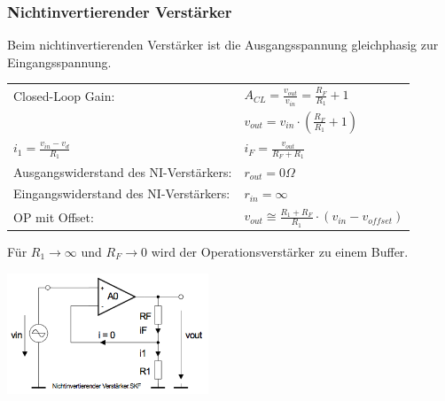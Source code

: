 	\subsubsection{Nichtinvertierender Verstärker}
			Beim nichtinvertierenden Verstärker ist die Ausgangsspannung
      gleichphasig zur Eingangsspannung.\\ 
			\begin{minipage}[T]{12cm}
      	
        \begin{tabular}{ll}
        	Closed-Loop Gain: &
        	$A_{CL}=\frac{v_{out}}{v_{in}}=\frac{R_F}{R_1}+1$\\
        	& $v_{out} = v_{in}\cdot(\frac{R_F}{R_1}+1)$ \\
        	$i_1=\frac{v_{in}-v_d}{R_1}$ &
        	$i_F=\frac{v_{out}}{R_F+R_1}$\\
          Ausgangswiderstand des NI-Verstärkers: &
          $r_{out}=0\Omega$\\
          Eingangswiderstand des NI-Verstärkers: &
          $r_{in}=\infty$\\
          OP mit Offset: &
          $v_{out} \cong \frac{R_1+R_F}{R_1} \cdot (v_{in}-v_{offset})$\\
        \end{tabular}
        Für $R_1 \to \infty$ und $R_F \to 0$ wird der Operationsverstärker zu einem
        Buffer.
            	
      \end{minipage}
			\begin{minipage}{6cm}
      	\includegraphics[width=6cm]{./images/ni-verstaerker.png}
      \end{minipage}\\

